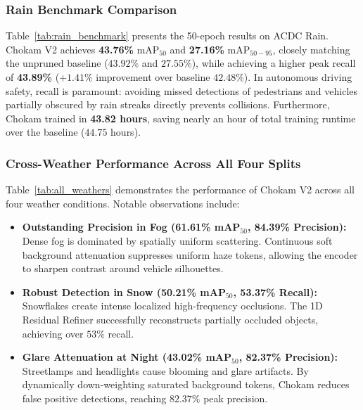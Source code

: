 \documentclass[conference]{IEEEtran}
\begin{document}
\subsubsection{Rain Benchmark Comparison}
Table~\ref{tab:rain_benchmark} presents the 50-epoch results on ACDC Rain. Chokam V2 achieves \textbf{43.76\%} $\text{mAP}_{50}$ and \textbf{27.16\%} $\text{mAP}_{50-95}$, closely matching the unpruned baseline ($43.92\%$ and $27.55\%$), while achieving a higher peak recall of \textbf{43.89\%} ($+1.41\%$ improvement over baseline $42.48\%$). In autonomous driving safety, recall is paramount: avoiding missed detections of pedestrians and vehicles partially obscured by rain streaks directly prevents collisions. Furthermore, Chokam trained in \textbf{43.82 hours}, saving nearly an hour of total training runtime over the baseline ($44.75$ hours).

\begin{table}[t]
\centering
\caption{50-Epoch Comparative Evaluation on ACDC Rain Split}
\label{tab:rain_benchmark}
\end{table}

\subsubsection{Cross-Weather Performance Across All Four Splits}
Table~\ref{tab:all_weathers} demonstrates the performance of Chokam V2 across all four weather conditions. Notable observations include:
\begin{itemize}
    \item \textbf{Outstanding Precision in Fog (61.61\% mAP$_{50}$, 84.39\% Precision):} Dense fog is dominated by spatially uniform scattering. Continuous soft background attenuation suppresses uniform haze tokens, allowing the encoder to sharpen contrast around vehicle silhouettes.
    \item \textbf{Robust Detection in Snow (50.21\% mAP$_{50}$, 53.37\% Recall):} Snowflakes create intense localized high-frequency occlusions. The 1D Residual Refiner successfully reconstructs partially occluded objects, achieving over $53\%$ recall.
    \item \textbf{Glare Attenuation at Night (43.02\% mAP$_{50}$, 82.37\% Precision):} Streetlamps and headlights cause blooming and glare artifacts. By dynamically down-weighting saturated background tokens, Chokam reduces false positive detections, reaching $82.37\%$ peak precision.
\end{itemize}
\end{document}
